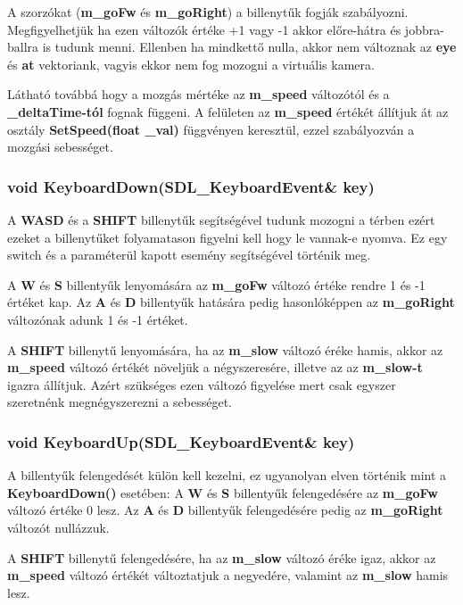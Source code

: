 A szorzókat (\textbf{m\_goFw} és \textbf{m\_goRight}) a billenytűk fogják szabályozni. Megfigyelhetjük ha ezen változók értéke +1 vagy -1 akkor előre-hátra és jobbra-ballra is tudunk menni. Ellenben ha mindkettő nulla, akkor nem változnak az \textbf{eye} és \textbf{at} vektoriank, vagyis ekkor nem fog mozogni a virtuális kamera. 

Látható továbbá hogy a mozgás mértéke az \textbf{m\_speed} változótól és a \textbf{\_deltaTime-tól} fognak függeni. A felületen az \textbf{m\_speed} értékét állítjuk át az osztály \textbf{SetSpeed(float \_val)} függvényen keresztül, ezzel szabályozván a mozgási sebességet.


\subsubsection{void KeyboardDown(SDL\_KeyboardEvent\& key) }

A \textbf{WASD} és a \textbf{SHIFT} billenytűk segítségével tudunk mozogni a térben ezért ezeket a billenytűket folyamatason figyelni kell hogy le vannak-e nyomva. Ez egy switch és a paraméterül kapott esemény segítségével történik meg.

A \textbf{W} és \textbf{S} billentyűk lenyomására az \textbf{m\_goFw} változó értéke rendre 1 és -1 értéket kap. Az \textbf{A} és \textbf{D} billentyűk hatására pedig hasonlóképpen az \textbf{m\_goRight} változónak adunk 1 és -1 értéket.

A \textbf{SHIFT} billenytű lenyomására, ha az \textbf{m\_slow} változó éréke hamis, akkor az \textbf{m\_speed} változó értékét növeljük a négyszeresére, illetve az az \textbf{m\_slow-t} igazra állítjuk. Azért szükséges ezen változó figyelése mert csak egyszer szeretnénk megnégyszerezni a sebességet. 

\subsubsection{void KeyboardUp(SDL\_KeyboardEvent\& key) }

A billentyűk felengedését külön kell kezelni, ez ugyanolyan elven történik mint a \textbf{KeyboardDown()} esetében: A \textbf{W} és \textbf{S} billentyűk felengedésére az \textbf{m\_goFw} változó értéke 0 lesz. Az \textbf{A} és \textbf{D} billentyűk felengedésére pedig az \textbf{m\_goRight} változót nullázzuk.

A \textbf{SHIFT} billenytű felengedésére, ha az \textbf{m\_slow} változó éréke igaz, akkor az \textbf{m\_speed} változó értékét változtatjuk a negyedére, valamint az \textbf{m\_slow} hamis lesz.

